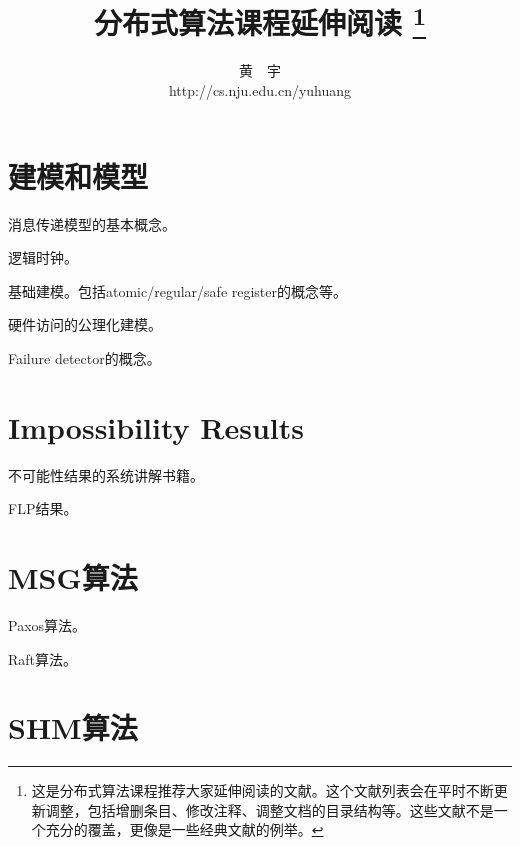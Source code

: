 \documentclass[UTF8]{ctexrep}
\begin{document}
\title{\bf \huge 分布式算法课程延伸阅读 \footnote{这是分布式算法课程推荐大家延伸阅读的文献。这个文献列表会在平时不断更新调整，包括增删条目、修改注释、调整文档的目录结构等。这些文献不是一个充分的覆盖，更像是一些经典文献的例举。}}

\author{黄\ \ 宇 \\ http://cs.nju.edu.cn/yuhuang}

\date{}
\maketitle

\tableofcontents


\chapter{建模和模型}

\cite{Lamport78} 消息传递模型的基本概念。

\cite{Mattern89} 逻辑时钟。

\cite{Lamport86a, Lamport86b} 基础建模。包括atomic/regular/safe register的概念等。

\cite{Misra86} 硬件访问的公理化建模。

\cite{Chandra96} Failure detector的概念。

\chapter{Impossibility Results}

\cite{Attiya14} 不可能性结果的系统讲解书籍。

\cite{Fischer85} FLP结果。

\chapter{MSG算法}

\cite{Lamport01} Paxos算法。

\cite{Ongaro14} Raft算法。

\chapter{SHM算法}
\end{document}
